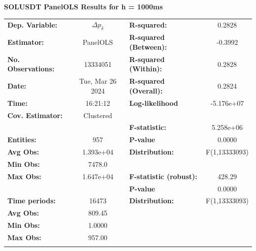 \begin{table}
\textbf{SOLUSDT PanelOLS Results for h = 1000ms}
\begin{center}
\begin{tabular}{lclc}
\hline
\textbf{Dep. Variable:}    &         $\Delta p_{\delta}$         & \textbf{  R-squared:         }   &      0.2828      \\
\textbf{Estimator:}        &      PanelOLS      & \textbf{  R-squared (Between):}  &     -0.3992      \\
\textbf{No. Observations:} &      13334051      & \textbf{  R-squared (Within):}   &      0.2828      \\
\textbf{Date:}             &  Tue, Mar 26 2024  & \textbf{  R-squared (Overall):}  &      0.2824      \\
\textbf{Time:}             &      16:21:12      & \textbf{  Log-likelihood     }   &    -5.176e+07    \\
\textbf{Cov. Estimator:}   &     Clustered      & \textbf{                     }   &                  \\
\textbf{}                  &                    & \textbf{  F-statistic:       }   &    5.258e+06     \\
\textbf{Entities:}         &        957         & \textbf{  P-value            }   &      0.0000      \\
\textbf{Avg Obs:}          &     1.393e+04      & \textbf{  Distribution:      }   &  F(1,13333093)   \\
\textbf{Min Obs:}          &       7478.0       & \textbf{                     }   &                  \\
\textbf{Max Obs:}          &     1.647e+04      & \textbf{  F-statistic (robust):} &      428.29      \\
\textbf{}                  &                    & \textbf{  P-value            }   &      0.0000      \\
\textbf{Time periods:}     &       16473        & \textbf{  Distribution:      }   &  F(1,13333093)   \\
\textbf{Avg Obs:}          &       809.45       & \textbf{                     }   &                  \\
\textbf{Min Obs:}          &       1.0000       & \textbf{                     }   &                  \\
\textbf{Max Obs:}          &       957.00       & \textbf{                     }   &                  \\
\textbf{}                  &                    & \textbf{                     }   &                  \\

\end{tabular}
\end{center}
\end{table}

